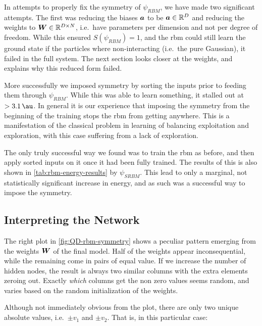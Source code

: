 \documentclass[Thesis.tex]{subfiles}
\begin{document}
In attempts to properly fix the symmetry of $\psi_{RBM}$, we have made two
significant attempts. The first was reducing the biases $\bm{a}$ to be $\bm{a}\in\mathbb{R}^D$ and reducing the weights to $\bm{W}\in\mathbb{R}^{D\times N}$,
i.e.\ have parameters per dimension and not per degree of freedom. While this ensured
$S(\psi_{RBM})=1$, and the \gls{rbm} could still learn the ground state if the
particles where non-interacting (i.e.\ the pure Gaussian), it failed in the full
system. The next section looks closer at the weights, and explains why this
reduced form failed.

More successfully we imposed symmetry by sorting the inputs prior to feeding
them through $\psi_{RBM}$. While this was able to learn something, it stalled
out at $>\SI{3.1}{\au}$. In general it is our experience that imposing the
symmetry from the beginning of the training stops the \gls{rbm} from getting anywhere.
This is a manifestation of the classical problem in learning of balancing
exploitation and exploration, with this case suffering from a lack of exploration.

The only truly successful way we found was to train the \gls{rbm} as before, and then
apply sorted inputs on it once it had been fully trained. The results of this is
also shown in \cref{tab:rbm-energy-results} by $\psi_{SRBM}$. This lead to only a
marginal, not statistically significant increase in energy, and as such was a
successful way to impose the symmetry.

\subsection{Interpreting the Network}

The right plot in \cref{fig:QD-rbm-symmetry} shows a peculiar pattern emerging
from the weights $\bm{W}$ of the final model. Half of the weights appear
inconsequential, while the remaining come in pairs of equal value. If we
increase the number of hidden nodes, the result is always two similar columns with the extra elements
zeroing out. Exactly \emph{which} columns get the non zero values seems random,
and varies based on the random initialization of the weights.

Although not immediately obvious from the plot, there are only two unique
absolute values, i.e.\ $\pm v_1$ and $\pm v_2$. That is, in this particular
case:
\end{document}
